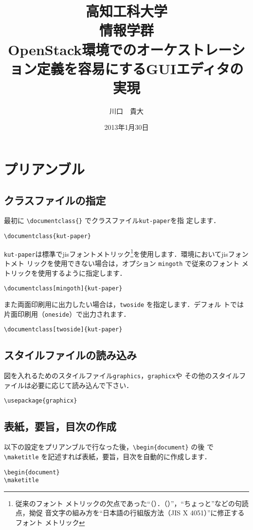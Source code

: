 \documentclass[mingoth]{kut-paper}		%
\title{
高知工科大学\\
情報学群\\
OpenStack環境でのオーケストレーション定義を容易にするGUIエディタの実現
}
\author{川口　貴大}
\date{2013年1月30日}
\begin{document}
\maketitle

\chapter{プリアンブル}

 \section{クラスファイルの指定}
 最初に \verb|\documentclass{}| でクラスファイル\texttt{kut-paper}を指
 定します．
\begin{verbatim}
\documentclass{kut-paper}
\end{verbatim}
 
 \texttt{kut-paper}は標準でjisフォントメトリック\footnote{従来のフォント
 メトリックの欠点であった``（）．（）''，``ちょっと''などの句読点，拗促
 音文字の組み方を``日本語の行組版方法（JIS X 4051）''に修正するフォント
 メトリック\cite{bib:latex2e}}を使用します．環境においてjisフォントメト
 リックを使用できない場合は，オプション \verb|mingoth| で従来のフォント
 メトリックを使用するように指定します．
\begin{verbatim}
\documentclass[mingoth]{kut-paper}
\end{verbatim}

 また両面印刷用に出力したい場合は，\verb|twoside| を指定します．デフォル
 トでは片面印刷用（\verb|oneside|）で出力されます．
\begin{verbatim}
\documentclass[twoside]{kut-paper}
\end{verbatim}

 \section{スタイルファイルの読み込み}
 図を入れるためのスタイルファイル\texttt{graphics}，\texttt{graphicx}や
 その他のスタイルファイルは必要に応じて読み込んで下さい．

\begin{verbatim}
\usepackage{graphicx}
\end{verbatim}

 \section{表紙，要旨，目次の作成}
 以下の設定をプリアンブルで行なった後，\verb|\begin{document}| の後
 で \verb|\maketitle| を記述すれば表紙，要旨，目次を自動的に作成します．
 \begin{verbatim}
\begin{document}
\maketitle
\end{verbatim}
 
\end{document}
